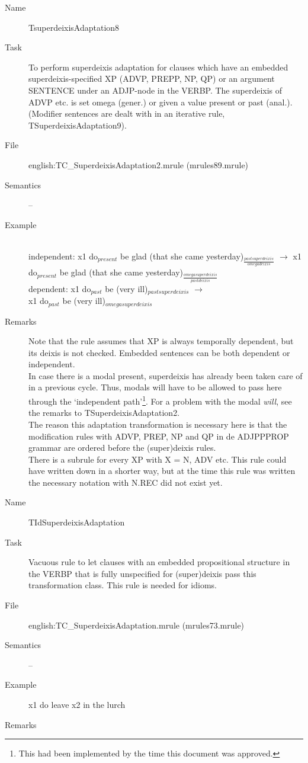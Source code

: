 \begin{description}
\vspace{1 cm}
\begin{description}
\item[Name]   TsuperdeixisAdaptation8
\item[Task] To perform superdeixis adaptation for clauses which have an 
embedded superdeixis-specified XP (ADVP, PREPP, NP, QP) or an argument 
SENTENCE under an 
ADJP-node in the VERBP. The superdeixis of ADVP etc. is set omega (gener.) or 
given a value present or past (anal.).
(Modifier sentences are dealt with in an iterative rule, 
TSuperdeixisAdaptation9).
\item[File] english:TC\_SuperdeixisAdaptation2.mrule (mrules89.mrule)
\item[Semantics] --
\item[Example] \mbox{}\\
independent: 
x1 do$_{present}$ be glad (that she came 
  yesterday)$_{\frac{pastsuperdeixis}{omegadeixis}}$ $\rightarrow$
x1 do$_{present}$ be glad (that she came
  yesterday)$_{\frac{omegasuperdeixis}{pastdeixis}}$
\\
dependent: 
x1 do$_{past}$ be (very ill)$_{pastsuperdeixis}$ $\rightarrow$ \\
x1 do$_{past}$ be (very ill)$_{omegasuperdeixis}$
\item[Remarks] 
Note that the rule assumes that XP is 
always temporally dependent, but its deixis is not checked. Embedded 
sentences can be both dependent or independent.\\
In case there is a 
modal present, superdeixis has already been taken care of in a previous cycle.
Thus, modals will have to be allowed to pass here through the 
`independent path'\footnote{This had been implemented by the time this 
document was approved.}. For a 
problem with the modal {\em will\/}, see the remarks to 
TSuperdeixisAdaptation2.\\
 The reason this adaptation transformation is necessary here is 
that the modification rules with ADVP, PREP, NP and QP in de ADJPPPROP grammar 
are ordered before the (super)deixis rules.\\
There is a subrule for every XP with X =
N, ADV etc. This rule could have written down in a shorter way, but at the time 
this rule was written the necessary notation with N.REC did not exist yet.
\end{description}

\vspace{1 cm}
\begin{description}
\item[Name] TIdSuperdeixisAdaptation
\item[Task] Vacuous rule to let clauses with an embedded propositional 
structure in the VERBP 
that is fully unspecified for (super)deixis pass this transformation class. 
This rule is needed for idioms.
\item[File] english:TC\_SuperdeixisAdaptation.mrule (mrules73.mrule)
\item[Semantics] --
\item[Example] x1 do leave x2 in the lurch
\item[Remarks] 
\end{description}


\end{description}
